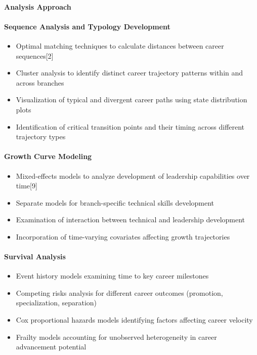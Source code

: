 \documentclass[./main.tex]{subfiles}
\begin{document}
\paragraph{Analysis Approach}\label{analysis-approach}

\paragraph{Sequence Analysis and Typology
Development}\label{sequence-analysis-and-typology-development}

\begin{itemize}
\tightlist
\item
  Optimal matching techniques to calculate distances between career
  sequences{[}2{]}
\item
  Cluster analysis to identify distinct career trajectory patterns
  within and across branches
\item
  Visualization of typical and divergent career paths using state
  distribution plots
\item
  Identification of critical transition points and their timing across
  different trajectory types
\end{itemize}

\paragraph{Growth Curve Modeling}\label{growth-curve-modeling}

\begin{itemize}
\tightlist
\item
  Mixed-effects models to analyze development of leadership capabilities
  over time{[}9{]}
\item
  Separate models for branch-specific technical skills development
\item
  Examination of interaction between technical and leadership
  development
\item
  Incorporation of time-varying covariates affecting growth trajectories
\end{itemize}

\paragraph{Survival Analysis}\label{survival-analysis}

\begin{itemize}
\tightlist
\item
  Event history models examining time to key career milestones
\item
  Competing risks analysis for different career outcomes (promotion,
  specialization, separation)
\item
  Cox proportional hazards models identifying factors affecting career
  velocity
\item
  Frailty models accounting for unobserved heterogeneity in career
  advancement potential
\end{itemize}
\end{document}
